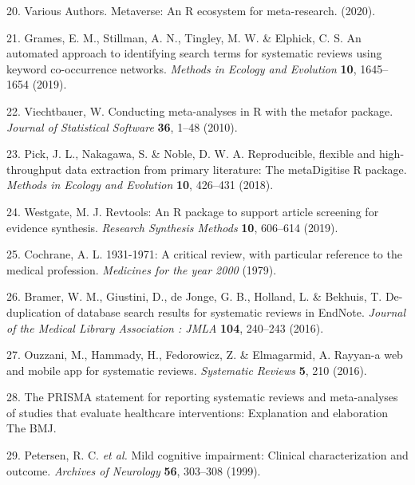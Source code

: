 \documentclass[a4paper, twoside]{templates/ociamthesis}
\begin{document}
\leavevmode\hypertarget{ref-variousauthors2020}{}%
20. Various Authors. Metaverse: An R ecosystem for meta-research. (2020).

\leavevmode\hypertarget{ref-grames2019automated}{}%
21. Grames, E. M., Stillman, A. N., Tingley, M. W. \& Elphick, C. S. An automated approach to identifying search terms for systematic reviews using keyword co-occurrence networks. \emph{Methods in Ecology and Evolution} \textbf{10}, 1645--1654 (2019).

\leavevmode\hypertarget{ref-metaforref}{}%
22. Viechtbauer, W. Conducting meta-analyses in R with the metafor package. \emph{Journal of Statistical Software} \textbf{36}, 1--48 (2010).

\leavevmode\hypertarget{ref-pick2018}{}%
23. Pick, J. L., Nakagawa, S. \& Noble, D. W. A. Reproducible, flexible and high-throughput data extraction from primary literature: The metaDigitise R package. \emph{Methods in Ecology and Evolution} \textbf{10}, 426--431 (2018).

\leavevmode\hypertarget{ref-westgate2019revtools}{}%
24. Westgate, M. J. Revtools: An R package to support article screening for evidence synthesis. \emph{Research Synthesis Methods} \textbf{10}, 606--614 (2019).

\leavevmode\hypertarget{ref-cochrane20001931}{}%
25. Cochrane, A. L. 1931-1971: A critical review, with particular reference to the medical profession. \emph{Medicines for the year 2000} (1979).

\leavevmode\hypertarget{ref-bramer2016}{}%
26. Bramer, W. M., Giustini, D., de Jonge, G. B., Holland, L. \& Bekhuis, T. De-duplication of database search results for systematic reviews in EndNote. \emph{Journal of the Medical Library Association : JMLA} \textbf{104}, 240--243 (2016).

\leavevmode\hypertarget{ref-ouzzani2016}{}%
27. Ouzzani, M., Hammady, H., Fedorowicz, Z. \& Elmagarmid, A. Rayyan-a web and mobile app for systematic reviews. \emph{Systematic Reviews} \textbf{5}, 210 (2016).

\leavevmode\hypertarget{ref-zotero-766}{}%
28. The PRISMA statement for reporting systematic reviews and meta-analyses of studies that evaluate healthcare interventions: Explanation and elaboration \textbar{} The BMJ.

\leavevmode\hypertarget{ref-petersen1999}{}%
29. Petersen, R. C. \emph{et al.} Mild cognitive impairment: Clinical characterization and outcome. \emph{Archives of Neurology} \textbf{56}, 303--308 (1999).
\end{document}
